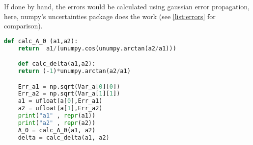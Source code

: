 If done by hand, the errors would be calculated using gaussian error propagation, here, numpy's uncertainties package does the work (see \autoref{list:errors} for comparison).

\begin{lstlisting}[language = Python, caption={Calculation of $a_1, a_2, A_0$ and $\delta$.}, label = {list:errors}]
    def calc_A_0 (a1,a2):
    return  a1/(unumpy.cos(unumpy.arctan(a2/a1)))

    def calc_delta(a1,a2):
    return (-1)*unumpy.arctan(a2/a1)

    Err_a1 = np.sqrt(Var_a[0][0])
    Err_a2 = np.sqrt(Var_a[1][1])
    a1 = ufloat(a[0],Err_a1)
    a2 = ufloat(a[1],Err_a2)
    print("a1" , repr(a1))
    print("a2" , repr(a2))
    A_0 = calc_A_0(a1, a2)
    delta = calc_delta(a1, a2)
\end{lstlisting}